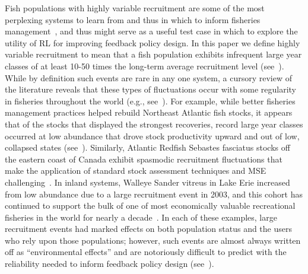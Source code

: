 \documentclass[floatfix,nofootinbib,longbibliography,notitlepage]{revtex4-2}
\def\eg{e.g.}
\begin{document}
Fish populations with highly variable recruitment are some of the most perplexing systems to learn from and thus in which to inform fisheries management~\cite{hjort1914,caddy-gulland}, and thus might serve as a useful test case in which to explore the utility of RL for improving feedback policy design.  
In this paper we define highly variable recruitment to mean that a fish population exhibits infrequent large year classes of at least 10-50 times the long-term average recruitment level (see~\cite{caddy-gulland}).  
While by definition such events are rare in any one system, a cursory review of the literature reveals that these types of fluctuations occur with some regularity in fisheries throughout the world (\eg, see~\cite{fisch-etal-2019,licandeo-etal-2020}).  
For example, while better fisheries management practices helped rebuild Northeast Atlantic fish stocks, it appears that of the stocks that displayed the strongest recoveries, record large year classes occurred at low abundance that drove stock productivity upward and out of low, collapsed states (see~\cite{zimmermann2019improved}).  
Similarly, Atlantic Redfish Sebastes fasciatus stocks off the eastern coast of Canada exhibit spasmodic recruitment fluctuations that make the application of standard stock assessment techniques and MSE challenging~\cite{licandeo-etal-2020}.  
In inland systems, Walleye Sander vitreus in Lake Erie increased from low abundance due to a large recruitment event in 2003, and this cohort has continued to support the bulk of one of most economically valuable recreational fisheries in the world for nearly a decade~\cite{schmitt-vandergoot}.  
In each of these examples, large recruitment events had marked effects on both population status and the users who rely upon those populations; however, such events are almost always written off as “environmental effects” and are notoriously difficult to predict with the reliability needed to inform feedback policy design (see~\cite{punt2014, myers1998}).  
	
\end{document}
